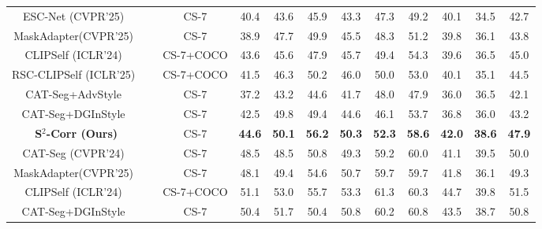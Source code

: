 \begin{table}[!t]
{\begin{tabular}{ccccccc|ccccc}
ESC-Net (CVPR'25)~\cite{ESCNet_2025_CVPR} &       & CS-7  & 40.4  & 43.6  & 45.9  & 43.3  & 47.3  & 49.2  & 40.1  & 34.5  & 42.7  \\
MaskAdapter(CVPR'25)~\cite{Li_2025_CVPR}  &       & CS-7  & 38.9  & 47.7  & 49.9  & 45.5  & 48.3  & 51.2  & 39.8  & 36.1  & 43.8  \\
CLIPSelf (ICLR'24)~\cite{wu2023clipself} &       & CS-7+COCO & 43.6  & 45.6  & 47.9  & 45.7  & 49.4  & 54.3  & 39.6  & 36.5  & 45.0  \\
RSC-CLIPSelf (ICLR'25)~\cite{qiu2025refining} &       & CS-7+COCO & 41.5  & 46.3  & 50.2  & 46.0  & 50.0  & 53.0  & 40.1  & 35.1  & 44.5  \\
CAT-Seg+AdvStyle~\cite{zhong2022adversarial} &       & CS-7  & 37.2  & 43.2  & 44.6  & 41.7  & 48.0  & 47.9  & 36.0  & 36.5  & 42.1  \\
CAT-Seg+DGInStyle~\cite{jia2024dginstyle} &       & CS-7  & 42.5  & 49.8  & 49.4  & 44.6  & 46.1  & 53.7  & 36.8  & 36.0  & 43.2  \\
 \textbf{S$^2$-Corr (Ours)} &       & CS-7  & \textbf{44.6} & \textbf{50.1} & \textbf{56.2} & \textbf{50.3} & \textbf{52.3} & \textbf{58.6} & \textbf{42.0} & \textbf{38.6} & \textbf{47.9} \\
\midrule
CAT-Seg (CVPR'24)~\cite{cho2024cat} &
 &
CS-7  & 48.5  & 48.5  & 50.8  & 49.3  & 59.2  & 60.0  & 41.1  & 39.5  & 50.0  \\
MaskAdapter(CVPR'25)~\cite{Li_2025_CVPR}  &       & CS-7  & 48.1  & 49.4  & 54.6  & 50.7  & 59.7  & 59.7  & 41.8  & 36.1  & 49.3  \\
CLIPSelf (ICLR'24)~\cite{wu2023clipself} &       & CS-7+COCO & 51.1  & 53.0  & 55.7  & 53.3  & 61.3  & 60.3  & 44.7  & 39.8  & 51.5  \\
CAT-Seg+DGInStyle~\cite{jia2024dginstyle} &       & CS-7  & 50.4  & 51.7  & 50.4  & 50.8  & 60.2  & 60.8  & 43.5  & 38.7  & 50.8  \\

\end{tabular}}
\end{table}
